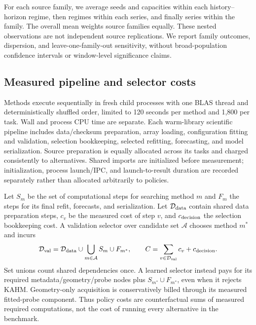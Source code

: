 For each source family, we average seeds and capacities within each
history--horizon regime, then regimes within each series, and finally
series within the family. The overall mean weights source families equally.  These nested observations are not
independent source replications.  We report family outcomes, dispersion, and
leave-one-family-out sensitivity, without broad-population confidence intervals
or window-level significance claims.

\subsection{Measured pipeline and selector costs}
\label{sec:nf-costs}

Methods execute sequentially in fresh child processes with one BLAS thread
and deterministically shuffled order, limited to 120 seconds per method and
1,800 per task.  Wall and process CPU time are separate.  Each warm-library
scientific pipeline includes
data/checksum preparation, array loading, configuration fitting and validation,
selection bookkeeping, selected refitting, forecasting, and model serialization.
Source preparation is equally allocated across its tasks and charged consistently
to alternatives.  Shared imports are initialized before measurement;
initialization, process launch/IPC, and launch-to-result duration are recorded
separately rather than allocated arbitrarily to policies.

Let $S_m$ be the set of computational steps for searching method $m$
and $F_m$ the steps for its final refit, forecasts, and serialization.
Let $\mathcal D_{\rm data}$ contain shared data preparation steps,
$c_v$ be the measured cost of step $v$, and $c_{\rm decision}$ the
selection bookkeeping cost. A validation selector over candidate set
$\mathcal A$ chooses method $m^*$ and incurs
\begin{equation}
 \mathcal D_{\rm val}=\mathcal D_{\rm data}
      \cup\bigcup_{m\in\mathcal A}S_m\cup F_{m^*},\qquad
 C=\sum_{v\in\mathcal D_{\rm val}}c_v+c_{\rm decision}.
 \label{eq:nf-selector-cost}
\end{equation}
Set unions count shared dependencies once.  A learned selector instead pays
for its required metadata/geometry/probe nodes plus $S_{m^*}\cup F_{m^*}$,
even when it rejects KAHM.  Geometry-only acquisition is conservatively billed
through its measured fitted-probe component.  Thus policy costs are
counterfactual sums of measured required computations, not the cost of running
every alternative in the benchmark.

